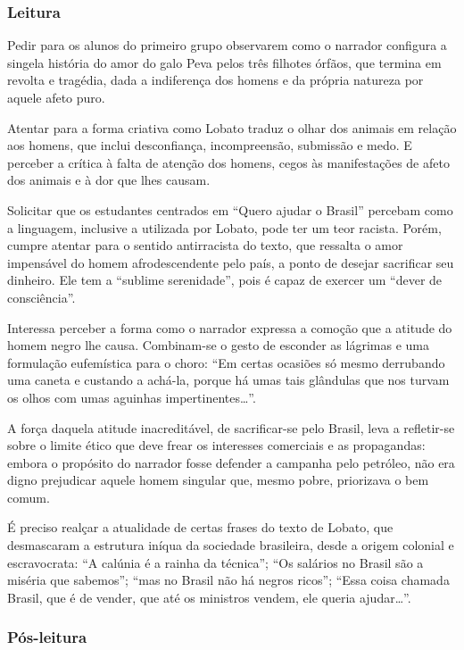 \documentclass[11pt]{extarticle}
\begin{document}
\subsubsection{Leitura}

Pedir para os alunos do primeiro grupo observarem como o narrador
configura a singela história do amor do galo Peva pelos três filhotes
órfãos, que termina em revolta e tragédia, dada a indiferença dos homens
e da própria natureza por aquele afeto puro.

Atentar para a forma criativa como Lobato traduz o olhar dos animais em
relação aos homens, que inclui desconfiança, incompreensão, submissão e
medo. E perceber a crítica à falta de atenção dos homens, cegos às
manifestações de afeto dos animais e à dor que lhes causam.

Solicitar que os estudantes centrados em ``Quero ajudar o Brasil''
percebam como a linguagem, inclusive a utilizada por Lobato, pode ter um
teor racista. Porém, cumpre atentar para o sentido antirracista do
texto, que ressalta o amor impensável do homem afrodescendente pelo
país, a ponto de desejar sacrificar seu dinheiro. Ele tem a ``sublime
serenidade'', pois é capaz de exercer um ``dever de consciência''.

Interessa perceber a forma como o narrador expressa a comoção que a
atitude do homem negro lhe causa. Combinam-se o gesto de esconder as
lágrimas e uma formulação eufemística para o choro: ``Em certas ocasiões
só mesmo derrubando uma caneta e custando a achá-la, porque há umas tais
glândulas que nos turvam os olhos com umas aguinhas
impertinentes\ldots{}''.

A força daquela atitude inacreditável, de sacrificar-se pelo Brasil,
leva a refletir-se sobre o limite ético que deve frear os interesses
comerciais e as propagandas: embora o propósito do narrador fosse
defender a campanha pelo petróleo, não era digno prejudicar aquele homem
singular que, mesmo pobre, priorizava o bem comum.

É preciso realçar a atualidade de certas frases do texto de Lobato, que
desmascaram a estrutura iníqua da sociedade brasileira, desde a origem
colonial e escravocrata: ``A calúnia é a rainha da técnica''; ``Os
salários no Brasil são a miséria que sabemos''; ``mas no Brasil não há
negros ricos''; ``Essa coisa chamada Brasil, que é de vender, que até os
ministros vendem, ele queria ajudar\ldots{}''.

\subsubsection{Pós-leitura}
\end{document}
